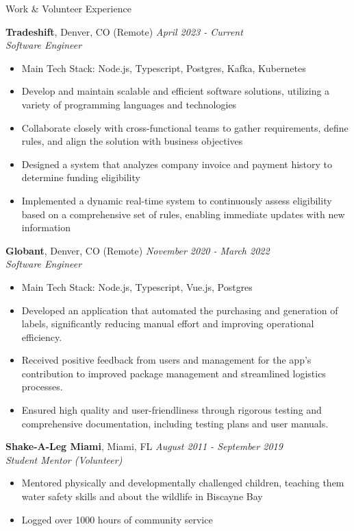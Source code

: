 \documentclass{res} %
\begin{document}

\begin{rSection}{Work \& Volunteer Experience}

  {\bf Tradeshift}, Denver, CO (Remote) \hfill {\em April 2023 - Current}
  \\ {\em Software Engineer}
  \begin{itemize}[leftmargin=*, topsep=-3pt] \itemsep -5pt
    \item[] Main Tech Stack: Node.js, Typescript, Postgres, Kafka, Kubernetes
    \item Develop and maintain scalable and efficient software solutions, utilizing a variety of programming languages and technologies
    \item Collaborate closely with cross-functional teams to gather requirements, define rules, and align the solution with business objectives
    \item Designed a system that analyzes company invoice and payment history to determine funding eligibility
    \item Implemented a dynamic real-time system to continuously assess eligibility based on a comprehensive set of rules, enabling immediate updates with new information
  \end{itemize}

  {\bf Globant}, Denver, CO (Remote) \hfill {\em November 2020 - March 2022}
  \\ {\em Software Engineer}
  \begin{itemize}[leftmargin=*, topsep=-3pt] \itemsep -5pt
    \item[] Main Tech Stack: Node.js, Typescript, Vue.js, Postgres
    \item Developed an application that automated the purchasing and generation of labels, significantly reducing manual effort and improving operational efficiency. 
    \item Received positive feedback from users and management for the app's contribution to improved package management and streamlined logistics processes.
    \item Ensured high quality and user-friendliness through rigorous testing and comprehensive documentation, including testing plans and user manuals.
  \end{itemize}
  
  {\bf Shake-A-Leg Miami}, Miami, FL \hfill {\em August 2011 - September 2019}
  \\ {\em Student Mentor (Volunteer)}
  \begin{itemize}[leftmargin=*, topsep=-3pt] \itemsep -5pt
    \item Mentored physically and developmentally challenged children, teaching them water safety skills and about the wildlife in Biscayne Bay
    \item Logged over 1000 hours of community service
  \end{itemize}
  \end{rSection}
\end{document}
